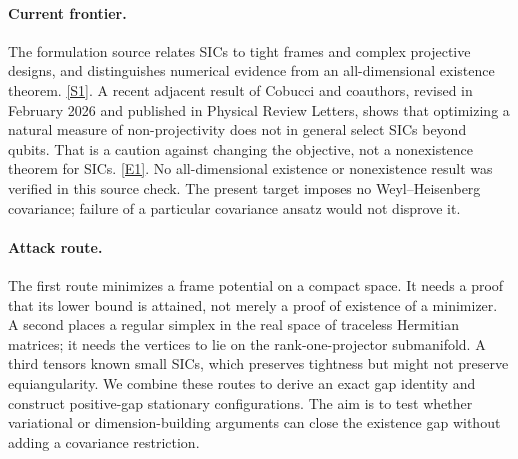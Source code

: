 \documentclass[11pt,a4paper]{article}
\newcommand{\sref}[2]{\hyperlink{source:#1:#2}{[S#2]}}
\newcommand{\eref}[2]{\hyperlink{extra:#1:#2}{[E#2]}}
\numberwithin{equation}{section}
\begin{document}
\paragraph{Current frontier.}
The formulation source relates SICs to tight frames and complex
projective designs, and distinguishes numerical evidence from an
all-dimensional existence theorem. \sref{statement}{1}.
A recent adjacent result of Cobucci and coauthors, revised in February
2026 and published in Physical Review Letters, shows that optimizing a
natural measure of non-projectivity does not in general select SICs
beyond qubits. That is a caution against changing the objective, not a
nonexistence theorem for SICs. \eref{statement}{1}.
No all-dimensional existence or nonexistence result was verified in this
source check. The present target imposes no Weyl--Heisenberg covariance;
failure of a particular covariance ansatz would not disprove it.

\paragraph{Attack route.}
The first route minimizes a frame potential on a compact space. It needs
a proof that its lower bound is attained, not merely a proof of existence
of a minimizer. A second places a regular simplex in the real space of
traceless Hermitian matrices; it needs the vertices to lie on the
rank-one-projector submanifold. A third tensors known small SICs, which
preserves tightness but might not preserve equiangularity. We combine
these routes to derive an exact gap identity and construct positive-gap
stationary configurations. The aim is to test whether variational or
dimension-building arguments can close the existence gap without adding
a covariance restriction.
\end{document}
